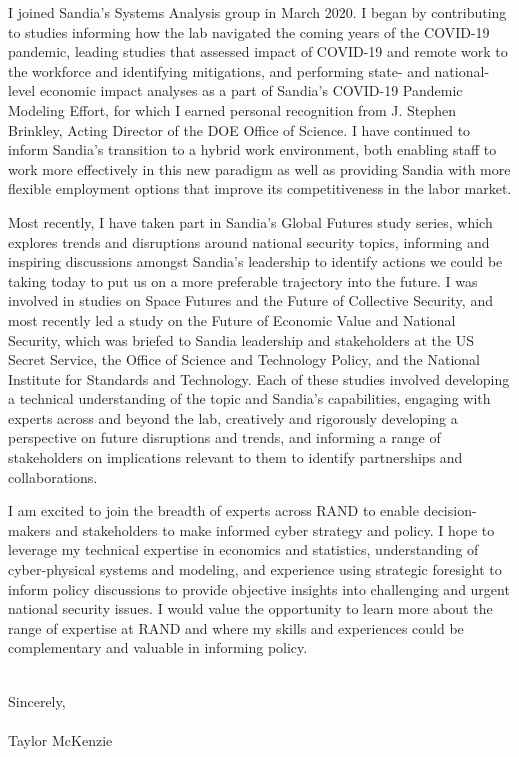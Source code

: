 \documentclass[10pt]{article}
\begin{document}
I joined Sandia's Systems Analysis group in March 2020. I began by contributing to studies informing how the lab navigated the coming years of the COVID-19 pandemic, leading studies that assessed impact of COVID-19 and remote work to the workforce and identifying mitigations, and performing state- and national-level economic impact analyses as a part of Sandia's COVID-19 Pandemic Modeling Effort, for which I earned personal recognition from J. Stephen Brinkley, Acting Director of the DOE Office of Science. I have continued to inform Sandia's transition to a hybrid work environment, both enabling staff to work more effectively in this new paradigm as well as providing Sandia with more flexible employment options that improve its competitiveness in the labor market.

Most recently, I have taken part in Sandia's Global Futures study series, which explores trends and disruptions around national security topics, informing and inspiring discussions amongst Sandia's leadership to identify actions we could be taking today to put us on a more preferable trajectory into the future. I was involved in studies on Space Futures and the Future of Collective Security, and most recently led a study on the Future of Economic Value and National Security, which was briefed to Sandia leadership and stakeholders at the US Secret Service, the Office of Science and Technology Policy, and the National Institute for Standards and Technology. Each of these studies involved developing a technical understanding of the topic and Sandia's capabilities, engaging with experts across and beyond the lab, creatively and rigorously developing a perspective on future disruptions and trends, and informing a range of stakeholders on implications relevant to them to identify partnerships and collaborations.

I am excited to join the breadth of experts across RAND to enable decision-makers and stakeholders to make informed cyber strategy and policy. I hope to leverage my technical expertise in economics and statistics, understanding of cyber-physical systems and modeling, and experience using strategic foresight to inform policy discussions to provide objective insights into challenging and urgent national security issues. I would value the opportunity to learn more about the range of expertise at RAND and where my skills and experiences could be complementary and valuable in informing policy.

\noindent \\Sincerely,\\\\
Taylor McKenzie
\end{document}
